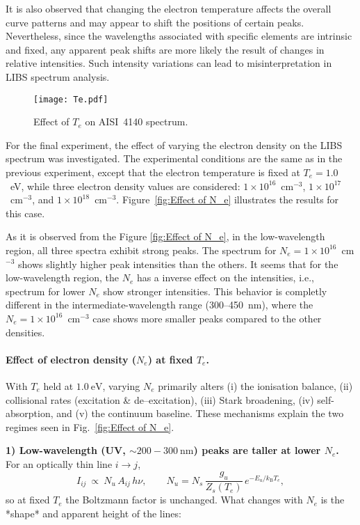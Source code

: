 \documentclass[12pt,a4paper]{article}
\begin{document}
	It is also observed that changing the electron temperature affects the overall curve patterns and may appear to shift the positions of certain peaks. Nevertheless, since the wavelengths associated with specific elements are intrinsic and fixed, any apparent peak shifts are more likely the result of changes in relative intensities. Such intensity variations can lead to misinterpretation in LIBS spectrum analysis.
	
		
		
	\begin{figure}[h!]
		\centering
		\texttt{[image: Te.pdf]}
		\caption{Effect of $T_e$ on AISI~4140 spectrum.}
		\label{fig:Effect of T_e}
	\end{figure}
	
	For the final experiment, the effect of varying the electron density on the LIBS spectrum was investigated. The experimental conditions are the same as in the previous experiment, except that the electron temperature is fixed at $T_e = 1.0$~eV, while three electron density values are considered: $1\times10^{16}$~cm$^{-3}$, $1\times10^{17}$~cm$^{-3}$, and $1\times10^{18}$~cm$^{-3}$. Figure~\ref{fig:Effect of N_e} illustrates the results for this case.
	
	 As it is observed from the Figure \ref{fig:Effect of N_e}, in the low-wavelength region, all three spectra exhibit strong peaks. The spectrum for $N_e = 1\times 10^{16}$~cm$^{-3}$ shows slightly higher peak intensities than the others. It seems that for the low-wavelength region, the $N_e$ has a inverse effect on the intensities, i.e., spectrum for lower $N_e$ show stronger intensities. This behavior is completly different in the intermediate-wavelength range (300--450~nm), where the $N_e = 1\times 10^{16}$~cm$^{-3}$ case shows more  smaller peaks compared to the other densities.
	 
	 \paragraph{Effect of electron density (\(N_e\)) at fixed \(T_e\).}
	 With \(T_e\) held at \(1.0~\mathrm{eV}\), varying \(N_e\) primarily alters (i) the ionisation balance, (ii) collisional rates (excitation \& de–excitation), (iii) Stark broadening, (iv) self-absorption, and (v) the continuum baseline. These mechanisms explain the two regimes seen in Fig.~\ref{fig:Effect of N_e}.
	 
	 \medskip
	 \textbf{1) Low-wavelength (UV, \(\sim200\!-\!300~\mathrm{nm}\)) peaks are taller at lower \(N_e\).}
	 For an optically thin line \(i\!\to\!j\),
	 \[
	 I_{ij}\ \propto\ N_u\,A_{ij}\,h\nu,
	 \qquad
	 N_u = N_s\,\frac{g_u}{Z_s(T_e)}\,e^{-E_u/k_{\mathrm B}T_e},
	 \]
	 so at fixed \(T_e\) the Boltzmann factor is unchanged. What changes with \(N_e\) is the *shape* and apparent height of the lines:
	 
\end{document}
